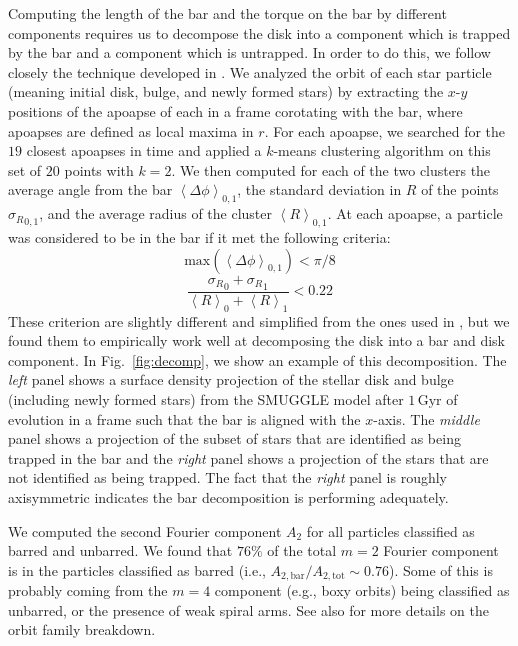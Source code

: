 \documentclass[twocolumn,linenumbers,trackchanges]{aastex631}
\newcommand{\SMUGGLE}{SMUGGLE}
\begin{document}
Computing the length of the bar and the torque on the bar by different
components requires us to decompose the disk into a component which is trapped
by the bar and a component which is untrapped. In order to do this, we follow
closely the technique developed in \citet{2016MNRAS.463.1952P}. We analyzed the
orbit of each star particle (meaning initial disk, bulge, and newly formed
stars) by extracting the $x$-$y$ positions of the apoapse of each in a frame
corotating with the bar, where apoapses are defined as local maxima in $r$. For
each apoapse, we searched for the $19$ closest apoapses in time and applied a
$k$-means clustering algorithm on this set of $20$ points with $k=2$. We then
computed for each of the two clusters the average angle from the bar
$\left<\Delta \phi\right>_{0,1}$, the standard deviation in $R$ of the points
${\sigma_R}_{0,1}$, and the average radius of the cluster
$\left<R\right>_{0,1}$. At each apoapse, a particle was considered to be in the
bar if it met the following criteria:
\begin{equation}
\textrm{max}\left(\left<\Delta \phi\right>_{0,1}\right) < \pi / 8
\end{equation}
\begin{equation}
\frac{{\sigma_R}_0 + {\sigma_R}_1}{\left<R\right>_0 + \left<R\right>_1} < 0.22
\end{equation}
These criterion are slightly different and simplified from the ones used in
\citet{2016MNRAS.463.1952P}, but we found them to empirically work well at
decomposing the disk into a bar and disk component. In Fig.~\ref{fig:decomp}, we
show an example of this decomposition. The \textit{left} panel shows a surface
density projection of the stellar disk and bulge (including newly formed stars)
from the \SMUGGLE{} model after $1\,\text{Gyr}$ of evolution in a frame such that
the bar is aligned with the $x$-axis. The \textit{middle} panel shows a
projection of the subset of stars that are identified as being trapped in the
bar and the \textit{right} panel shows a projection of the stars that are not
identified as being trapped. The fact that the \textit{right} panel is roughly
axisymmetric indicates the bar decomposition is performing adequately.

We computed the second Fourier component $A_2$ for all particles classified as
barred and unbarred. We found that $76\%$ of the total $m=2$ Fourier component
is in the particles classified as barred (i.e.,
$A_{2,\textrm{bar}}/A_{2,\textrm{tot}}\sim0.76$). Some of this is probably
coming from the $m=4$ component (e.g., boxy orbits) being classified as
unbarred, or the presence of weak spiral arms. See also
\citet{2021MNRAS.500..838P} for more details on the orbit family breakdown.
\end{document}
